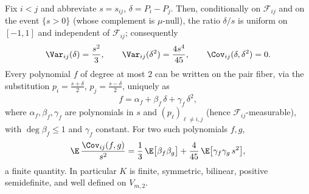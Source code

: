 \documentclass[../main.tex]{subfiles}
\begin{document}
\begin{lemma}
\label{lem:sol-frd2-pair}
Fix $i<j$ and abbreviate $s=s_{ij}$, $\delta=P_i-P_j$.  Then, conditionally on
$\mathcal F_{ij}$ and on the event $\{s>0\}$ (whose complement is $\mu$-null), the
ratio $\delta/s$ is uniform on $[-1,1]$ and independent of $\mathcal F_{ij}$;
consequently
\begin{equation}
  \Var_{ij}(\delta)=\frac{s^2}3,\qquad
  \Var_{ij}(\delta^2)=\frac{4s^4}{45},\qquad
  \Cov_{ij}(\delta,\delta^2)=0.
  \label{eq:sol-frd2-delta-moments}
\end{equation}
Every polynomial $f$ of degree at most $2$ can be written on the pair fiber, via the
substitution $p_i=\tfrac{s+\delta}2$, $p_j=\tfrac{s-\delta}2$, uniquely as
\begin{equation}
  f=\alpha_f+\beta_f\,\delta+\gamma_f\,\delta^2,
  \label{eq:sol-frd2-abc}
\end{equation}
where $\alpha_f,\beta_f,\gamma_f$ are polynomials in $s$ and $(p_\ell)_{\ell\ne i,j}$
(hence $\mathcal F_{ij}$-measurable), with $\deg\beta_f\le1$ and $\gamma_f$ constant.
For two such polynomials $f,g$,
\begin{equation}
  \E\,\frac{\Cov_{ij}(f,g)}{s^2}
  =\frac13\,\E\bigl[\beta_f\beta_g\bigr]
  +\frac4{45}\,\E\bigl[\gamma_f\gamma_g\,s^2\bigr],
  \label{eq:sol-frd2-pair-energy}
\end{equation}
a finite quantity.  In particular $K$ is finite, symmetric, bilinear, positive
semidefinite, and well defined on $V_{m,2}$.
\end{lemma}
\end{document}
